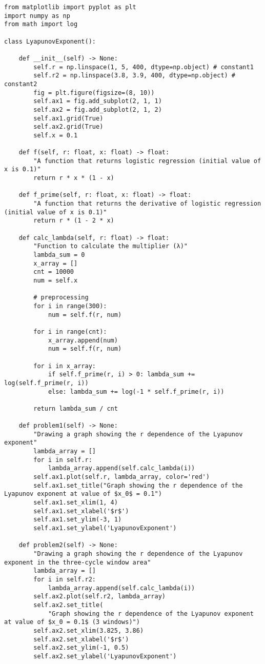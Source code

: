 \documentclass[a4j]{jsarticle}
\begin{document}
\begin{lstlisting}[caption=Pythonによるリアプノフ指数の依存性を示したグラフの描画]
from matplotlib import pyplot as plt
import numpy as np
from math import log

class LyapunovExponent():

    def __init__(self) -> None:
        self.r = np.linspace(1, 5, 400, dtype=np.object) # constant1
        self.r2 = np.linspace(3.8, 3.9, 400, dtype=np.object) # constant2
        fig = plt.figure(figsize=(8, 10))
        self.ax1 = fig.add_subplot(2, 1, 1)
        self.ax2 = fig.add_subplot(2, 1, 2)
        self.ax1.grid(True)
        self.ax2.grid(True)
        self.x = 0.1

    def f(self, r: float, x: float) -> float:
        "A function that returns logistic regression (initial value of x is 0.1)"
        return r * x * (1 - x)

    def f_prime(self, r: float, x: float) -> float:
        "A function that returns the derivative of logistic regression (initial value of x is 0.1)"
        return r * (1 - 2 * x)

    def calc_lambda(self, r: float) -> float:
        "Function to calculate the multiplier (λ)"
        lambda_sum = 0
        x_array = []
        cnt = 10000
        num = self.x

        # preprocessing
        for i in range(300):
            num = self.f(r, num)

        for i in range(cnt):
            x_array.append(num)
            num = self.f(r, num)

        for i in x_array:
            if self.f_prime(r, i) > 0: lambda_sum += log(self.f_prime(r, i))
            else: lambda_sum += log(-1 * self.f_prime(r, i))

        return lambda_sum / cnt

    def problem1(self) -> None:
        "Drawing a graph showing the r dependence of the Lyapunov exponent"
        lambda_array = []
        for i in self.r:
            lambda_array.append(self.calc_lambda(i))
        self.ax1.plot(self.r, lambda_array, color='red')
        self.ax1.set_title("Graph showing the r dependence of the Lyapunov exponent at value of $x_0$ = 0.1")
        self.ax1.set_xlim(1, 4)
        self.ax1.set_xlabel('$r$')
        self.ax1.set_ylim(-3, 1)
        self.ax1.set_ylabel('LyapunovExponent')

    def problem2(self) -> None:
        "Drawing a graph showing the r dependence of the Lyapunov exponent in the three-cycle window area"
        lambda_array = []
        for i in self.r2:
            lambda_array.append(self.calc_lambda(i))
        self.ax2.plot(self.r2, lambda_array)
        self.ax2.set_title(
            "Graph showing the r dependence of the Lyapunov exponent at value of $x_0 = 0.1$ (3 windows)")
        self.ax2.set_xlim(3.825, 3.86)
        self.ax2.set_xlabel('$r$')
        self.ax2.set_ylim(-1, 0.5)
        self.ax2.set_ylabel('LyapunovExponent')


\end{lstlisting}
\end{document}
